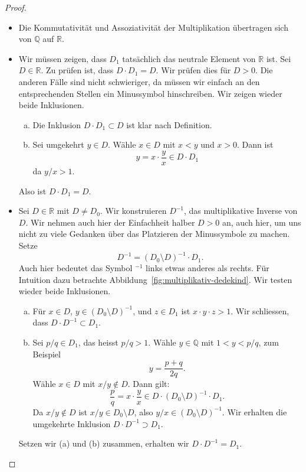 \documentclass[../main.tex]{subfiles}
\begin{document}
\begin{proof}
  \leavevmode
  \begin{itemize}
    \item Die Kommutativität und Assoziativität der Multiplikation
      übertragen sich von $\mathbb Q$ auf $\mathbb R$.
    \item Wir müssen zeigen, dass $D_{1}$ tatsächlich das neutrale
      Element von $\mathbb R$ ist.
      Sei $D \in \mathbb R$. Zu prüfen ist, dass $D \cdot D_{1} = D$.
      Wir prüfen dies für $D > 0$. Die anderen Fälle sind nicht
      schwieriger, da müssen wir einfach an den entsprechenden Stellen
      ein Minussymbol hinschreiben.
      Wir zeigen wieder beide Inklusionen.
      \begin{enumerate}[(a)]
        \item Die Inklusion $D \cdot D_{1} \subset D$ ist klar nach Definition.
        \item Sei umgekehrt $y \in D$. Wähle $x \in D$ mit $x < y$ und $x > 0$.
          Dann ist \[y = x \cdot \frac{y}{x} \in D \cdot D_{1}\] da $y/x > 1$.
      \end{enumerate}
      Also ist $D \cdot D_{1} = D$.
    \item
      Sei $D \in \mathbb R$ mit $D \neq D_{0}$.
      Wir konstruieren $D^{-1}$, das multiplikative Inverse von $D$.
      Wir nehmen auch hier der Einfachheit halber $D > 0$ an,
      auch hier, um uns nicht zu viele Gedanken über das Platzieren
      der Minussymbole zu machen. Setze
      \[D^{-1} = {(D_{0} \setminus D)}^{-1} \cdot D_{1}.\]
      Auch hier bedeutet das Symbol ${}^{-1}$ links etwas anderes als rechts.
      Für Intuition dazu betrachte Abbildung~\ref{fig:multiplikativ-dedekind}.
      Wir testen wieder beide Inklusionen.
      \begin{enumerate}[(a)]
        \item Für $x \in D$, $y \in {(D_{0} \setminus D)}^{-1}$, und
          $z \in D_{1}$ ist $x \cdot y \cdot z > 1$.
          Wir schliessen, dass $D \cdot D^{-1} \subset D_{1}$.
        \item Sei $p/q \in D_{1}$, das heisst $p/q > 1$.
          Wähle $y \in \mathbb Q$ mit $1 < y < p/q$, zum Beispiel
          \[y = \frac{p + q}{2q}.\]
          Wähle $x \in D$ mit $x/y \notin D$. Dann gilt:
          \[\frac{p}{q} = x \cdot \frac{y}{x} \in D \cdot
          {(D_{0} \setminus D)}^{-1} \cdot D_{1}.\]
          Da $x/y \notin D$ ist $x / y \in D_{0} \setminus D$,
          also $y/x \in {(D_{0} \setminus D)}^{-1}$.
          Wir erhalten die umgekehrte Inklusion $D \cdot D^{-1} \supset D_{1}$.
      \end{enumerate}
      Setzen wir (a) und (b) zusammen, erhalten wir $D \cdot D^{-1} = D_{1}$.
      \qedhere
  \end{itemize}
\end{proof}
\end{document}
